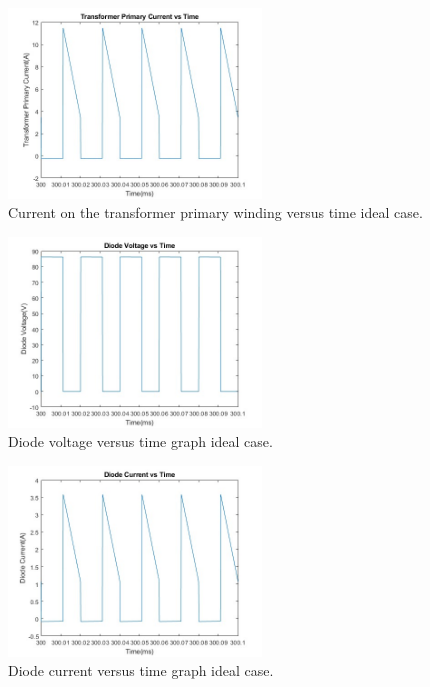 \begin{figure}[H]
    \centering
    \includegraphics[width=0.6\textwidth]{Figures/mat_prim_current.jpg}
    \caption{Current on the transformer primary winding versus time ideal case.}
    \label{fig:mat_lm}
\end{figure}
\begin{figure}[H]
    \centering
    \includegraphics[width=0.6\textwidth]{Figures/mat_diode_volt.jpg}
    \caption{Diode voltage versus time graph ideal case.}
    \label{fig:mat_v_d}
\end{figure}
\begin{figure}[H]
    \centering
    \includegraphics[width=0.6\textwidth]{Figures/mat_diode_current.jpg}
    \caption{Diode current versus time graph ideal case.}
    \label{fig:mat_i_d}
\end{figure}

